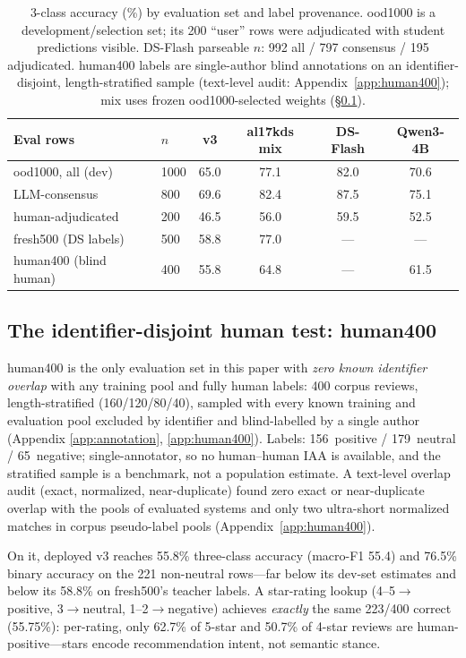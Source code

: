 \begin{table}[t]
\centering\scriptsize
\setlength{\tabcolsep}{2.5pt}
\begin{tabular}{llcccc}
\toprule
Eval rows & $n$ & v3 & al17kds mix & DS-Flash & Qwen3-4B \\
\midrule
ood1000, all (dev) & 1000 & 65.0 & 77.1 & 82.0 & 70.6 \\
\quad LLM-consensus & 800 & 69.6 & 82.4 & 87.5 & 75.1 \\
\quad human-adjudicated & 200 & 46.5 & 56.0 & 59.5 & 52.5 \\
\midrule
fresh500 (DS labels) & 500 & 58.8 & 77.0 & --- & --- \\
\midrule
human400 (blind human) & 400 & 55.8 & 64.8 & --- & 61.5 \\
\bottomrule
\end{tabular}
\caption{3-class accuracy (\%) by evaluation set and label provenance.
ood1000 is a development/selection set; its 200 ``user'' rows were
adjudicated with student predictions visible. DS-Flash parseable $n$:
992 all / 797 consensus / 195 adjudicated. human400 labels are
single-author blind annotations on an identifier-disjoint,
length-stratified sample (text-level audit:
Appendix~\ref{app:human400}); mix uses frozen ood1000-selected weights
(\S\ref{sec:res-human400}).}
\label{tab:ood-results}
\end{table}

\subsection{The identifier-disjoint human test: human400}
\label{sec:res-human400}

human400 is the only evaluation set in this paper with \emph{zero
known identifier overlap} with any training pool and fully human
labels: 400 corpus reviews, length-stratified (160/120/80/40),
sampled with every known training and evaluation pool excluded by
identifier and blind-labelled by a single author (Appendix
\ref{app:annotation}, \ref{app:human400}). Labels: 156~positive / 179~neutral / 65~negative;
single-annotator, so no human--human IAA is available, and the
stratified sample is a benchmark, not a population estimate. A
text-level overlap audit (exact, normalized, near-duplicate) found
zero exact or near-duplicate overlap with the pools of evaluated
systems and only two ultra-short normalized matches in corpus
pseudo-label pools (Appendix~\ref{app:human400}).

On it, deployed v3 reaches 55.8\% three-class accuracy (macro-F1
55.4) and 76.5\% binary accuracy on the 221 non-neutral rows---far
below its dev-set estimates and below its 58.8\% on fresh500's
teacher labels. A star-rating lookup (4--5$\to$positive, 3$\to$neutral,
1--2$\to$negative) achieves \emph{exactly} the same 223/400 correct
(55.75\%): per-rating, only 62.7\% of 5-star and 50.7\% of 4-star
reviews are human-positive---stars encode recommendation intent, not
semantic stance.

